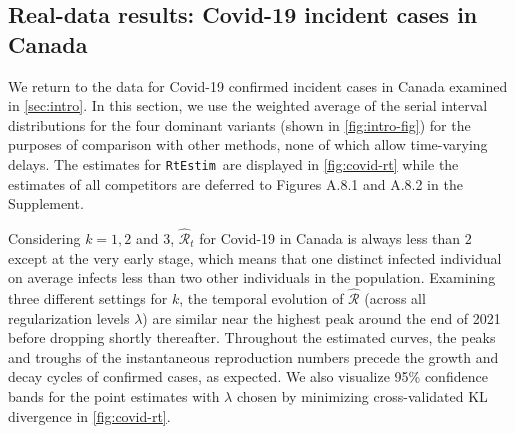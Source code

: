 \documentclass[10pt,letterpaper]{article}
\def\RtEstim{\texttt{RtEstim}}
\def\calR{\mathcal{R}}
\begin{document}
\subsection{Real-data results: Covid-19 incident cases in Canada}

We return to the data for Covid-19 confirmed incident cases in Canada examined
in \autoref{sec:intro}. In this section, we use the weighted average of the
serial interval distributions for the four dominant variants (shown in
\autoref{fig:intro-fig}) for the purposes of comparison with other methods, none
of which allow time-varying delays. The estimates for \RtEstim\ are displayed in
\autoref{fig:covid-rt} while the estimates of all competitors are deferred to
Figures A.8.1 and A.8.2 in the Supplement. 

Considering $k=1,2$ and 3, $\widehat{\calR}_t$ for Covid-19 in Canada is always
less than $2$ except at the very early stage, which means that one distinct
infected individual on average infects less than two other individuals in the
population. Examining three different settings for $k$, the temporal evolution
of $\widehat{\calR}$ (across all regularization levels $\lambda$) are similar
near the highest peak around the end of 2021 before dropping shortly thereafter.
Throughout the estimated curves, the peaks and troughs of the instantaneous
reproduction numbers precede the growth and decay cycles of confirmed cases, as
expected. We also visualize 95\% confidence bands for the point estimates with
$\lambda$ chosen by minimizing cross-validated KL divergence in
\autoref{fig:covid-rt}.     
\end{document}
